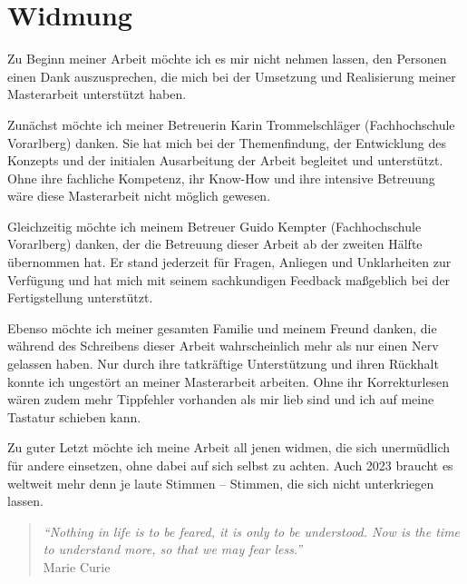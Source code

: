 \documentclass[a4paper,12pt,twoside]{scrreprt}
\begin{document}
\section*{Widmung}
\label{sec:widmung}

Zu Beginn meiner Arbeit möchte ich es mir nicht nehmen lassen, den Personen einen Dank auszusprechen, die mich bei der Umsetzung und Realisierung meiner Masterarbeit unterstützt haben.

\medskip

Zunächst möchte ich meiner Betreuerin Karin Trommelschläger (Fachhochschule Vorarlberg) danken. Sie hat mich bei der Themenfindung, der Entwicklung des Konzepts und der initialen Ausarbeitung der Arbeit begleitet und unterstützt. Ohne ihre fachliche Kompetenz, ihr Know-How und ihre intensive Betreuung wäre diese Masterarbeit nicht möglich gewesen.

Gleichzeitig möchte ich meinem Betreuer Guido Kempter (Fachhochschule Vorarlberg) danken, der die Betreuung dieser Arbeit ab der zweiten Hälfte übernommen hat. Er stand jederzeit für Fragen, Anliegen und Unklarheiten zur Verfügung und hat mich mit seinem sachkundigen Feedback maßgeblich bei der Fertigstellung unterstützt.

\medskip

Ebenso möchte ich meiner gesamten Familie und meinem Freund danken, die während des Schreibens dieser Arbeit wahrscheinlich mehr als nur einen Nerv gelassen haben. Nur durch ihre tatkräftige Unterstützung und ihren Rückhalt konnte ich ungestört an meiner Masterarbeit arbeiten. Ohne ihr Korrekturlesen wären zudem mehr Tippfehler vorhanden als mir lieb sind und ich auf meine Tastatur schieben kann.

\medskip

Zu guter Letzt möchte ich meine Arbeit all jenen widmen, die sich unermüdlich für andere einsetzen, ohne dabei auf sich selbst zu achten. Auch 2023 braucht es weltweit mehr denn je laute Stimmen -- Stimmen, die sich nicht unterkriegen lassen.

\bigskip

\begin{quote}
    \begin{flushright}
        \textit{\enquote{Nothing in life is to be feared, it is only to be understood. Now is the time to understand more, so that we may fear less.}}\\
        Marie Curie
    \end{flushright}
\end{quote}
\end{document}
